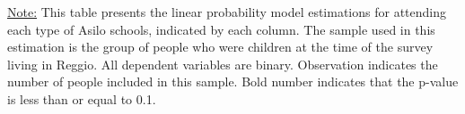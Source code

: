 \begin{footnotesize}
\noindent\underline{Note:} This table presents the linear probability model estimations for attending each type of Asilo schools, indicated by each column. The sample used in this estimation is the group of people who were children at the time of the survey living in Reggio. All dependent variables are binary. Observation indicates the number of people included in this sample. Bold number indicates that the p-value is less than or equal to 0.1.
\end{footnotesize}
